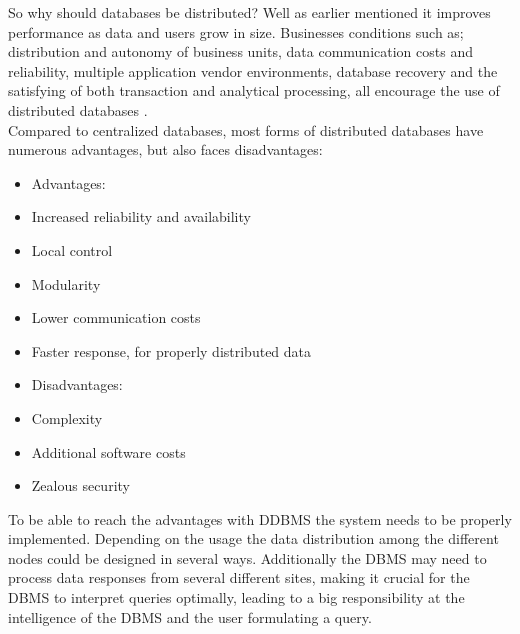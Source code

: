 \documentclass{cslthse-msc}
\begin{document}
So why should databases be distributed? Well as earlier mentioned it improves performance as data and users grow in size. Businesses conditions such as; distribution and autonomy of business units, data communication costs and reliability, multiple application vendor environments, database recovery and the satisfying of both transaction and analytical processing, all encourage the use of distributed databases \cite{DDBMS}.\\ Compared to centralized databases, most forms of distributed databases have numerous advantages, but also faces disadvantages:     

\begin{center}
\noindent\begin{minipage}[t]{0.5\linewidth}
    \begin{itemize}
    \item[] Advantages:
    \item{Increased reliability and availability}
    \item{Local control}
    \item{Modularity}
    \item{Lower communication costs}
    \item{Faster response, for properly distributed data}
    \end{itemize}
    \end{minipage}%
    \begin{minipage}[t]{0.4\linewidth}
    \begin{itemize}
    \item[] Disadvantages: 
    \item{Complexity}
    \item{Additional software costs}
    \item{Zealous security}
    \end{itemize}
\end{minipage}
\end{center}
\begin{flushright}
\cite{advdisDDBMS}
\end{flushright}
To be able to reach the advantages with DDBMS the system needs to be properly implemented. Depending on the usage the data distribution among the different nodes could be designed in several ways. Additionally the DBMS may need to process data responses from several different sites, making it crucial for the DBMS to interpret queries optimally, leading to a big responsibility at the intelligence of the DBMS and the user formulating a query. 
\end{document}
